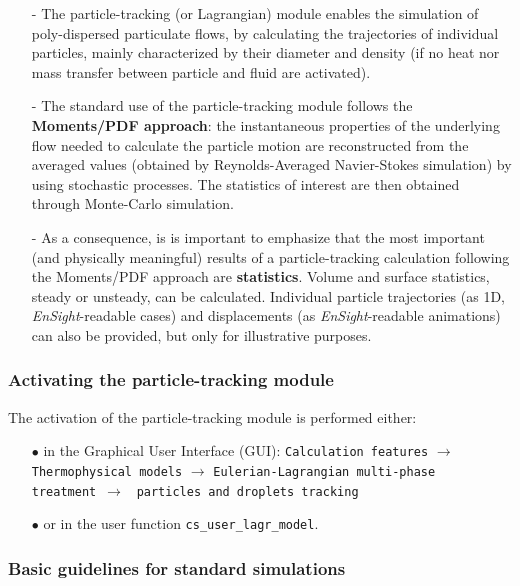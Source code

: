 {{{\begin{itemize}
\item[-] The particle-tracking (or Lagrangian) module enables the simulation of poly-dispersed particulate flows, by calculating the trajectories of individual particles, mainly characterized by their diameter and density (if no heat nor mass transfer between particle and fluid are activated).

\item[-] The standard use of the particle-tracking module follows the \textbf{Moments/PDF approach}: the instantaneous properties of the underlying flow needed to calculate the particle motion are reconstructed from the averaged values (obtained by Reynolds-Averaged Navier-Stokes simulation) by using stochastic processes. The statistics of interest are then obtained through Monte-Carlo simulation.

\item[-] As a consequence, is is important to emphasize that the most important (and physically meaningful) results of a particle-tracking calculation following the Moments/PDF approach are \mbox{\textbf{statistics}}. Volume and surface statistics, steady or unsteady, can be calculated. Individual particle trajectories (as 1D, \textit{EnSight}-readable cases) and displacements (as \textit{EnSight}-readable animations) can also be provided, but only for illustrative purposes.

\end{itemize}

\subsubsection{Activating the particle-tracking module}\label{sec:acti-lag}

The activation of the particle-tracking module is performed either:
%
\begin{itemize}
 \item [$\bullet$] in the Graphical User Interface (GUI): \texttt{Calculation features} $\rightarrow$ \texttt{Thermophysical models} $\rightarrow$ \texttt{Eulerian-Lagrangian multi-phase treatment}~$\rightarrow$ ~\texttt{particles and droplets tracking}
 \item [$\bullet$] or in the user function \texttt{cs\_user\_lagr\_model}.
\end{itemize}

\subsubsection{Basic guidelines for standard simulations}

}}}
